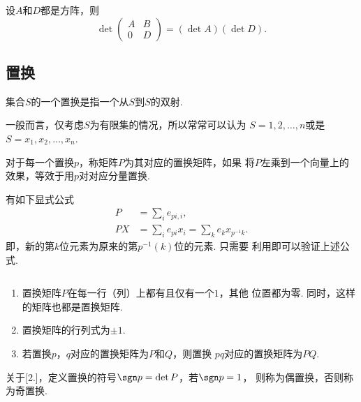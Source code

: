   \begin{lemma}[分块矩阵行列式]
    设$A$和$D$都是方阵，则
    \[
      \det \begin{pmatrix}
        A & B \\
        0 & D
      \end{pmatrix} = (\det A)(\det D).
    \]
  \end{lemma}

\subsection{置换}

  \begin{defi}
    集合$S$的一个置换是指一个从$S$到$S$的双射.
  \end{defi}
  \remark
    一般而言，仅考虑$S$为有限集的情况，所以常常可以认为
    $S={1,2,\dots,n}$或是$S={x_1,x_2,\dots,x_n}$.

  \begin{defi}[置换矩阵]
    对于每一个置换$p$，称矩阵$P$为其对应的置换矩阵，如果
    将$P$左乘到一个向量上的效果，等效于用$p$对对应分量置换.
  \end{defi}
  \remark
    有如下显式公式
    \[\begin{split}
      P &= \sum_i e_{pi,i}, \\
      PX &= \sum_i e_{pi}x_i = \sum_k e_k x_{p^{-1}k}.
    \end{split}\]
    即，新的第$k$位元素为原来的第$p^{-1}(k)$位的元素. 只需要
    利用即可以验证上述公式.

  \begin{pos}[置换矩阵]
    $\,$
    \begin{enumerate}
      \item 置换矩阵$P$在每一行（列）上都有且仅有一个$1$，其他
        位置都为零. 同时，这样的矩阵也都是置换矩阵.
      \item 置换矩阵的行列式为$\pm 1$.
      \item 若置换$p$，$q$对应的置换矩阵为$P$和$Q$，则置换
        $pq$对应的置换矩阵为$PQ$.
    \end{enumerate}
  \end{pos}
  \remark
    关于[2.]，定义置换的符号$\sgn p = \det P$，若$\sgn p = 1$，
    则称为偶置换，否则称为奇置换.
